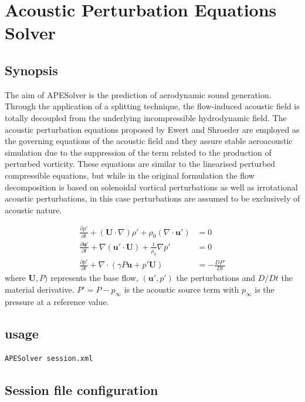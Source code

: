\chapter{Acoustic Perturbation Equations Solver}

\section{Synopsis}
The aim of APESolver is the prediction of aerodynamic sound generation. Through
the application of a splitting technique, the flow-induced acoustic field is
totally decoupled from the underlying incompressible hydrodynamic field. The
acoustic perturbation equations proposed by Ewert and Shroeder are employed as
the governing equations of the acoustic field and they assure stable
aeroacoustic simulation due to the suppression of the term related to the
production of perturbed vorticity. These equations are similar to the linearised
perturbed compressible equations, but while in the original formulation the flow
decomposition is based on solenoidal vortical perturbations as well as
irrotational acoustic perturbations, in this case perturbations are assumed to
be exclusively of acoustic nature.

\begin{align*}
      \frac{\partial \rho'}{\partial t} 
        + (\mathbf{U}\cdot \nabla)\rho'+\rho_0(\nabla \cdot \mathbf{u}') &= 0 \\
      \frac{\partial \mathbf{u}'}{\partial t}
        +\nabla(\mathbf{u}' \cdot \mathbf{U})+\frac{1}{\rho_0}\nabla p' &= 0 \\
      \frac{\partial p'}{\partial t}
        +\nabla \cdot (\gamma P \mathbf{u}+p'\mathbf{U})&=-\frac{DP'}{Dt}
\end{align*}
where $\mathbf{U},P)$ represents the base flow, $(\mathbf{u}',p')$
the perturbations and $D/Dt$ the material derivative.
$P'=P-p_{\infty}$ is the acoustic source term with $p_\infty$ is
the pressure at a reference value.

\section{usage}
\begin{lstlisting}[style=BashInputStyle]
APESolver session.xml
\end{lstlisting}

\section{Session file configuration}


